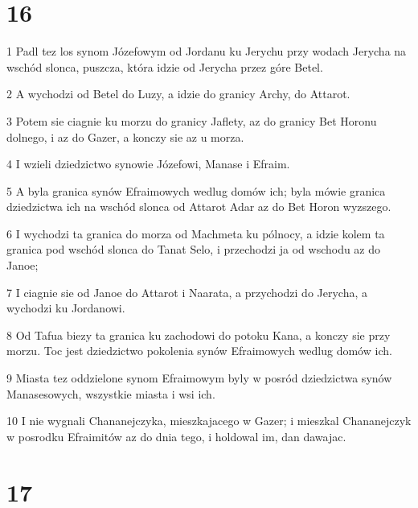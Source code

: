 \chapter{16}

\par 1 Padl tez los synom Józefowym od Jordanu ku Jerychu przy wodach Jerycha na wschód slonca, puszcza, która idzie od Jerycha przez góre Betel.
\par 2 A wychodzi od Betel do Luzy, a idzie do granicy Archy, do Attarot.
\par 3 Potem sie ciagnie ku morzu do granicy Jaflety, az do granicy Bet Horonu dolnego, i az do Gazer, a konczy sie az u morza.
\par 4 I wzieli dziedzictwo synowie Józefowi, Manase i Efraim.
\par 5 A byla granica synów Efraimowych wedlug domów ich; byla mówie granica dziedzictwa ich na wschód slonca od Attarot Adar az do Bet Horon wyzszego.
\par 6 I wychodzi ta granica do morza od Machmeta ku pólnocy, a idzie kolem ta granica pod wschód slonca do Tanat Selo, i przechodzi ja od wschodu az do Janoe;
\par 7 I ciagnie sie od Janoe do Attarot i Naarata, a przychodzi do Jerycha, a wychodzi ku Jordanowi.
\par 8 Od Tafua biezy ta granica ku zachodowi do potoku Kana, a konczy sie przy morzu. Toc jest dziedzictwo pokolenia synów Efraimowych wedlug domów ich.
\par 9 Miasta tez oddzielone synom Efraimowym byly w posród dziedzictwa synów Manasesowych, wszystkie miasta i wsi ich.
\par 10 I nie wygnali Chananejczyka, mieszkajacego w Gazer; i mieszkal Chananejczyk w posrodku Efraimitów az do dnia tego, i holdowal im, dan dawajac.

\chapter{17}

